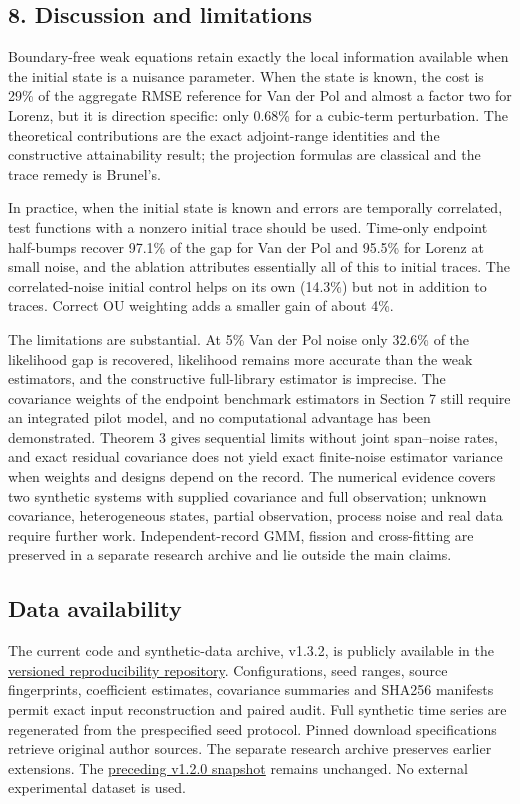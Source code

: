 \documentclass[
  american,
  11pt,
]{article}
\begin{document}
\subsection{8. Discussion and
limitations}\label{discussion-and-limitations}

Boundary-free weak equations retain exactly the local information
available when the initial state is a nuisance parameter. When the state
is known, the cost is 29\% of the aggregate RMSE reference for Van der
Pol and almost a factor two for Lorenz, but it is direction specific:
only 0.68\% for a cubic-term perturbation. The theoretical contributions
are the exact adjoint-range identities and the constructive
attainability result; the projection formulas are classical and the
trace remedy is Brunel's.

In practice, when the initial state is known and errors are temporally
correlated, test functions with a nonzero initial trace should be used.
Time-only endpoint half-bumps recover 97.1\% of the gap for Van der Pol
and 95.5\% for Lorenz at small noise, and the ablation attributes
essentially all of this to initial traces. The correlated-noise initial
control helps on its own (14.3\%) but not in addition to traces. Correct
OU weighting adds a smaller gain of about 4\%.

The limitations are substantial. At 5\% Van der Pol noise only 32.6\% of
the likelihood gap is recovered, likelihood remains more accurate than
the weak estimators, and the constructive full-library estimator is
imprecise. The covariance weights of the endpoint benchmark estimators
in Section 7 still require an integrated pilot model, and no
computational advantage has been demonstrated. Theorem 3 gives
sequential limits without joint span--noise rates, and exact residual
covariance does not yield exact finite-noise estimator variance when
weights and designs depend on the record. The numerical evidence covers
two synthetic systems with supplied covariance and full observation;
unknown covariance, heterogeneous states, partial observation, process
noise and real data require further work. Independent-record GMM,
fission and cross-fitting are preserved in a separate research archive
and lie outside the main claims.

\subsection{Data availability}\label{data-availability}

The current code and synthetic-data archive, v1.3.2, is publicly
available in the
\href{https://github.com/malyshevdanil/wsindy-information-limits/tree/v1.3.2}{versioned
reproducibility repository}. Configurations, seed ranges, source
fingerprints, coefficient estimates, covariance summaries and SHA256
manifests permit exact input reconstruction and paired audit. Full
synthetic time series are regenerated from the prespecified seed
protocol. Pinned download specifications retrieve original author
sources. The separate research archive preserves earlier extensions. The
\href{https://doi.org/10.5281/zenodo.23313935}{preceding v1.2.0
snapshot} remains unchanged. No external experimental dataset is used.
\end{document}
